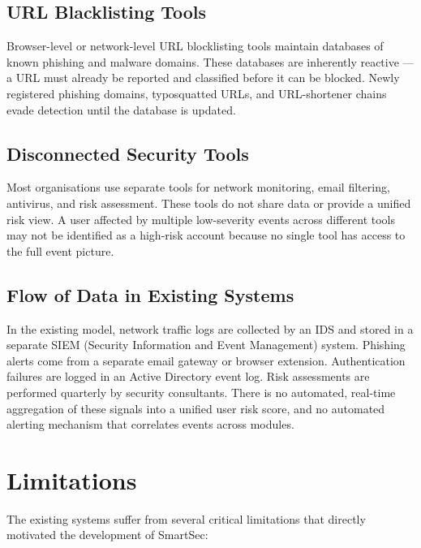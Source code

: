 \subsection*{URL Blacklisting Tools}

Browser-level or network-level URL blocklisting tools maintain databases of known phishing and malware domains. These databases are inherently reactive --- a URL must already be reported and classified before it can be blocked. Newly registered phishing domains, typosquatted URLs, and URL-shortener chains evade detection until the database is updated.

\subsection*{Disconnected Security Tools}

Most organisations use separate tools for network monitoring, email filtering, antivirus, and risk assessment. These tools do not share data or provide a unified risk view. A user affected by multiple low-severity events across different tools may not be identified as a high-risk account because no single tool has access to the full event picture.

\subsection*{Flow of Data in Existing Systems}

In the existing model, network traffic logs are collected by an IDS and stored in a separate SIEM (Security Information and Event Management) system. Phishing alerts come from a separate email gateway or browser extension. Authentication failures are logged in an Active Directory event log. Risk assessments are performed quarterly by security consultants. There is no automated, real-time aggregation of these signals into a unified user risk score, and no automated alerting mechanism that correlates events across modules.

\section{Limitations}

The existing systems suffer from several critical limitations that directly motivated the development of SmartSec:

